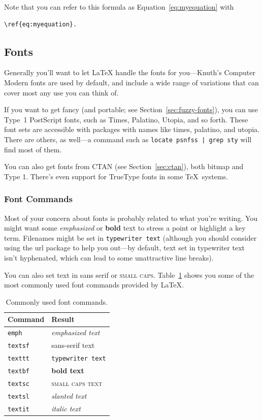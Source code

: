 \documentclass{icmmcm}
\newcommand{\bslash}{\symbol{'134}}%
\newcommand{\bsl}{{\texttt{\bslash}}}
\newcommand{\com}[1]{\bsl\texttt{#1}\xspace}
\newcommand{\package}[1]{\textsf{#1}\xspace}
\newcommand{\latex}{\LaTeX\xspace}
\begin{document}
{Note that you can refer to this formula as
Equation~\ref{eq:myequation} with
\begin{verbatim}
\ref{eq:myequation}.
\end{verbatim}


\subsection{Fonts}%
\label{sec:fonts}

Generally you'll want to let \latex handle the fonts for you---Knuth's
Computer Modern fonts are used by default, and include a wide range of
variations that can cover most any use you can think of.  

If you want to get fancy (and portable; see
Section~\ref{sec:fuzzy-fonts}), you can use Type~1 PostScript fonts,
such as Times, Palatino, Utopia, and so forth.  These font sets are
accessible with packages with names like \package{times},
\package{palatino}, and \package{utopia}.  There are others, as
well---a command such as \com{locate psnfss | grep sty} will find most
of them.

You can also get fonts from CTAN (see Section~\ref{sec:ctan}), both
bitmap and Type 1.  There's even support for TrueType fonts in some
\TeX\ systems.

\subsubsection{Font Commands}%
\label{sec:font-commands}

Most of your concern about fonts is probably related to what you're
writing.  You might want some \emph{emphasized} or \textbf{bold} text
to stress a point or highlight a key term.  Filenames might be set in
\texttt{typewriter text} (although you should consider using the
\package{url} package to help you out---by default, text set in
typewriter text isn't hyphenated, which can lead to some unattractive
line breaks).

You can also set text in \textsf{sans serif} or \textsc{small caps}.
Table~\ref{tab:font-commands} shows you some of the most commonly used
font commands provided by \latex.

\begin{table}[htbp]
  \centering
  \begin{tabular}{ll}
    \toprule
    Command       &   Result\\
    \midrule
    \com{emph}    &   \emph{emphasized text}\\
    \com{textsf}  &   \textsf{sans-serif text}\\
    \com{texttt}  &   \texttt{typewriter text}\\
    \com{textbf}  &   \textbf{bold text}\\
    \com{textsc}  &   \textsc{small caps text}\\
    \com{textsl}  &   \textsl{slanted text}\\
    \com{textit}  &   \textit{italic text}\\
    \bottomrule
  \end{tabular}
  \caption[Commonly used font commands]{Commonly used font commands.}
  \label{tab:font-commands}
\end{table}

}
\end{document}
